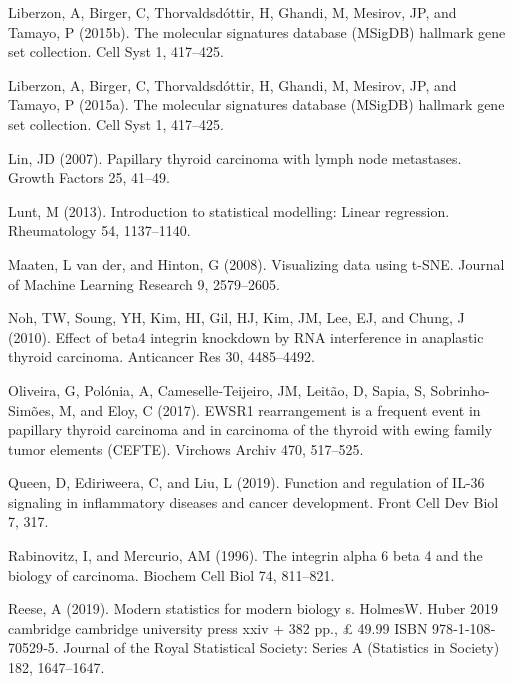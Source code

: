 \documentclass[
  11pt,
  parskip,
  oneside]{scrreprt}
\newlength{\cslhangindent}
\newlength{\cslentryspacingunit} %
\newenvironment{CSLReferences}[2] %
 {%
  \setlength{\parindent}{0pt}
  \ifodd #1
  \let\oldpar\par
  \def\par{\hangindent=\cslhangindent\oldpar}
  \fi
  \setlength{\parskip}{#2\cslentryspacingunit}
 }%
 {}
\begin{document}
\begin{CSLReferences}{0}{0}
\leavevmode{}%
Liberzon, A, Birger, C, Thorvaldsdóttir, H, Ghandi, M, Mesirov, JP, and
Tamayo, P (2015b). The molecular signatures database (MSigDB) hallmark
gene set collection. Cell Syst 1, 417--425.

\leavevmode{}%
Liberzon, A, Birger, C, Thorvaldsdóttir, H, Ghandi, M, Mesirov, JP, and
Tamayo, P (2015a). The molecular signatures database (MSigDB) hallmark
gene set collection. Cell Syst 1, 417--425.

\leavevmode{}%
Lin, JD (2007). Papillary thyroid carcinoma with lymph node metastases.
Growth Factors 25, 41--49.

\leavevmode{}%
Lunt, M (2013). Introduction to statistical modelling: Linear
regression. Rheumatology 54, 1137--1140.

\leavevmode{}%
Maaten, L van der, and Hinton, G (2008). Visualizing data using t-SNE.
Journal of Machine Learning Research 9, 2579--2605.

\leavevmode{}%
Noh, TW, Soung, YH, Kim, HI, Gil, HJ, Kim, JM, Lee, EJ, and Chung, J
(2010). Effect of {beta}4 integrin knockdown by RNA interference in
anaplastic thyroid carcinoma. Anticancer Res 30, 4485--4492.

\leavevmode{}%
Oliveira, G, Polónia, A, Cameselle-Teijeiro, JM, Leitão, D, Sapia, S,
Sobrinho-Simões, M, and Eloy, C (2017). EWSR1 rearrangement is a
frequent event in papillary thyroid carcinoma and in carcinoma of the
thyroid with ewing family tumor elements (CEFTE). Virchows Archiv 470,
517--525.

\leavevmode{}%
Queen, D, Ediriweera, C, and Liu, L (2019). Function and regulation of
IL-36 signaling in inflammatory diseases and cancer development. Front
Cell Dev Biol 7, 317.

\leavevmode{}%
Rabinovitz, I, and Mercurio, AM (1996). The integrin alpha 6 beta 4 and
the biology of carcinoma. Biochem Cell Biol 74, 811--821.

\leavevmode{}%
Reese, A (2019). Modern statistics for modern biology s. HolmesW. Huber
2019 cambridge cambridge university press xxiv + 382 pp., £ 49.99 ISBN
978‐1‐108‐70529‐5. Journal of the Royal Statistical Society: Series A
(Statistics in Society) 182, 1647--1647.


\end{CSLReferences}
\end{document}
